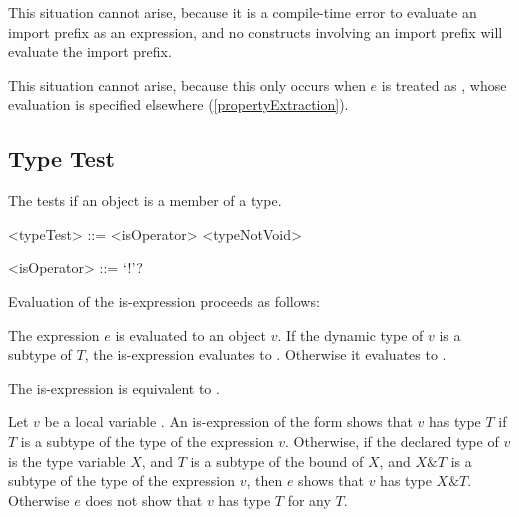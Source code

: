 \documentclass[makeidx]{article}
\begin{document}
{\LMHash{}%
This situation cannot arise,
because it is a compile-time error
to evaluate an import prefix as an expression,
and no constructs involving an import prefix
will evaluate the import prefix.
\EndCase

\LMHash{}%
This situation cannot arise,
because this only occurs when $e$ is treated as
,
whose evaluation is specified elsewhere
(\ref{propertyExtraction}).
\EndCase


\subsection{Type Test}

\LMHash{}%
The  tests if an object is a member of a type.

\begin{grammar}
<typeTest> ::= <isOperator> <typeNotVoid>

<isOperator> ::= \IS{} `!'?
\end{grammar}

\LMHash{}%
Evaluation of the is-expression  proceeds as follows:

\LMHash{}%
The expression $e$ is evaluated to an object $v$.
If the dynamic type of $v$ is a subtype of $T$,
the is-expression evaluates to \TRUE.
Otherwise it evaluates to \FALSE.


\LMHash{}%
The is-expression  is equivalent to
.

\LMHash{}%
Let $v$ be a local variable
.
An is-expression of the form 
shows that $v$ has type $T$
if $T$ is a subtype of the type of the expression $v$.
%
Otherwise,
if the declared type of $v$ is the type variable $X$,
and $T$ is a subtype of the bound of $X$,
and $X \& T$ is a subtype of the type of the expression $v$,
then $e$ shows that $v$ has type $X \& T$.
%
Otherwise $e$ does not show that $v$ has type $T$ for any $T$.

}
\end{document}
